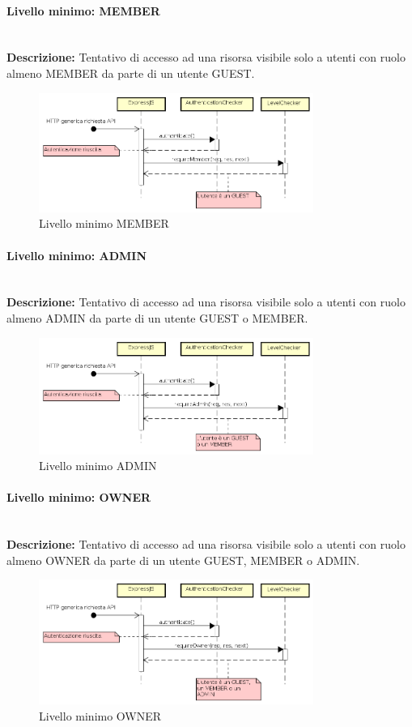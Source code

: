 \paragraph{Livello minimo: MEMBER} \mbox{} \\
\textbf{Descrizione:} Tentativo di accesso ad una risorsa visibile solo a utenti con ruolo almeno MEMBER da parte di un utente GUEST.
\begin{figure}[H]
\centering
\includegraphics[width=0.8\textwidth]{res/sections/backend/sequence/requireMemberFallita.png}
\caption{Livello minimo MEMBER}
\end{figure}
\paragraph{Livello minimo: ADMIN} \mbox{} \\
\textbf{Descrizione:} Tentativo di accesso ad una risorsa visibile solo a utenti con ruolo almeno ADMIN da parte di un utente GUEST o MEMBER.
\begin{figure}[H]
\centering
\includegraphics[width=0.8\textwidth]{res/sections/backend/sequence/requireAdminFallita.png}
\caption{Livello minimo ADMIN}
\end{figure}
\paragraph{Livello minimo: OWNER}  \mbox{} \\
\textbf{Descrizione:} Tentativo di accesso ad una risorsa visibile solo a utenti con ruolo almeno OWNER da parte di un utente GUEST, MEMBER o ADMIN.
\begin{figure}[H]
\centering
\includegraphics[width=0.8\textwidth]{res/sections/backend/sequence/requireOwnerFallita.png}
\caption{Livello minimo OWNER}
\end{figure}
